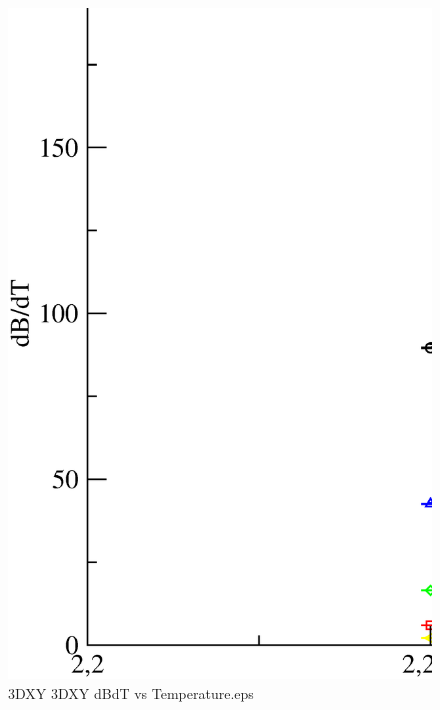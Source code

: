\begin{figure}[!htpb]
  \centering
  \includegraphics[width=\textwidth]{./plots/3DXY/3DXY_dBdT_vs_Temperature.eps}
  \caption{3DXY 3DXY dBdT vs Temperature.eps}
\end{figure}

